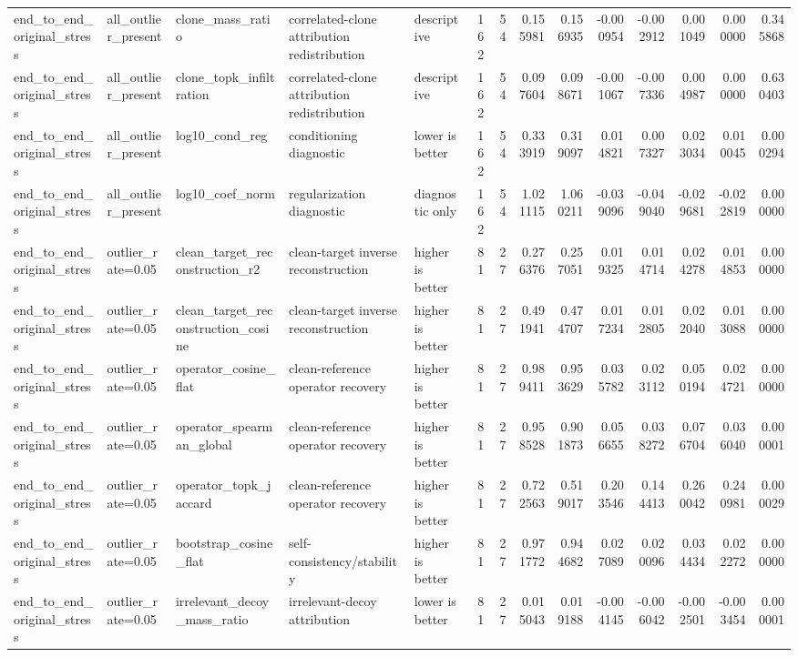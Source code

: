 \begin{table}[t]
\begin{tabular}{lllllrrrrrrrrr}
end_to_end_original_stress & all_outlier_present & clone_mass_ratio & correlated-clone attribution redistribution & descriptive & 162 & 54 & 0.155981 & 0.156935 & -0.000954 & -0.002912 & 0.001049 & 0.000000 & 0.345868 \\
end_to_end_original_stress & all_outlier_present & clone_topk_infiltration & correlated-clone attribution redistribution & descriptive & 162 & 54 & 0.097604 & 0.098671 & -0.001067 & -0.007336 & 0.004987 & 0.000000 & 0.630403 \\
end_to_end_original_stress & all_outlier_present & log10_cond_reg & conditioning diagnostic & lower is better & 162 & 54 & 0.333919 & 0.319097 & 0.014821 & 0.007327 & 0.023034 & 0.010045 & 0.000294 \\
end_to_end_original_stress & all_outlier_present & log10_coef_norm & regularization diagnostic & diagnostic only & 162 & 54 & 1.021115 & 1.060211 & -0.039096 & -0.049040 & -0.029681 & -0.022819 & 0.000000 \\
end_to_end_original_stress & outlier_rate=0.05 & clean_target_reconstruction_r2 & clean-target inverse reconstruction & higher is better & 81 & 27 & 0.276376 & 0.257051 & 0.019325 & 0.014714 & 0.024278 & 0.014853 & 0.000000 \\
end_to_end_original_stress & outlier_rate=0.05 & clean_target_reconstruction_cosine & clean-target inverse reconstruction & higher is better & 81 & 27 & 0.491941 & 0.474707 & 0.017234 & 0.012805 & 0.022040 & 0.013088 & 0.000000 \\
end_to_end_original_stress & outlier_rate=0.05 & operator_cosine_flat & clean-reference operator recovery & higher is better & 81 & 27 & 0.989411 & 0.953629 & 0.035782 & 0.023112 & 0.050194 & 0.024721 & 0.000000 \\
end_to_end_original_stress & outlier_rate=0.05 & operator_spearman_global & clean-reference operator recovery & higher is better & 81 & 27 & 0.958528 & 0.901873 & 0.056655 & 0.038272 & 0.076704 & 0.036040 & 0.000001 \\
end_to_end_original_stress & outlier_rate=0.05 & operator_topk_jaccard & clean-reference operator recovery & higher is better & 81 & 27 & 0.722563 & 0.519017 & 0.203546 & 0.144413 & 0.260042 & 0.240981 & 0.000029 \\
end_to_end_original_stress & outlier_rate=0.05 & bootstrap_cosine_flat & self-consistency/stability & higher is better & 81 & 27 & 0.971772 & 0.944682 & 0.027089 & 0.020096 & 0.034434 & 0.022272 & 0.000000 \\
end_to_end_original_stress & outlier_rate=0.05 & irrelevant_decoy_mass_ratio & irrelevant-decoy attribution & lower is better & 81 & 27 & 0.015043 & 0.019188 & -0.004145 & -0.006042 & -0.002501 & -0.003454 & 0.000001 \\

\end{tabular}
\end{table}

